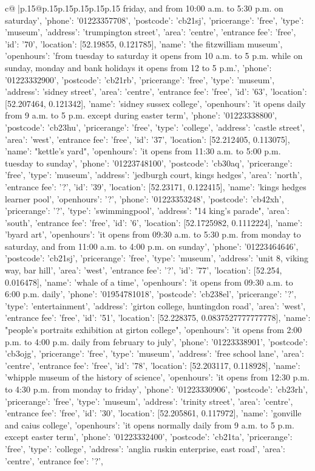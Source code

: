 \documentclass{article}
\begin{document}
{\begin{supertabular}{c@{$\;$}|p{.15\linewidth}@{}p{.15\linewidth}p{.15\linewidth}p{.15\linewidth}p{.15\linewidth}p{.15\linewidth}}
{{{friday, and from 10:00 a.m. to 5:30 p.m. on saturday', 'phone': '01223357708', 'postcode': 'cb21sj', 'pricerange': 'free', 'type': 'museum'}, {'address': 'trumpington street', 'area': 'centre', 'entrance fee': 'free', 'id': '70', 'location': [52.19855, 0.121785], 'name': 'the fitzwilliam museum', 'openhours': 'from tuesday to saturday it opens from 10 a.m. to 5 p.m. while on sunday, monday and bank holidays it opens from 12 to 5 p.m.', 'phone': '01223332900', 'postcode': 'cb21rb', 'pricerange': 'free', 'type': 'museum'}, {'address': 'sidney street', 'area': 'centre', 'entrance fee': 'free', 'id': '63', 'location': [52.207464, 0.121342], 'name': 'sidney sussex college', 'openhours': 'it opens daily from 9 a.m. to 5 p.m. except during easter term', 'phone': '01223338800', 'postcode': 'cb23hu', 'pricerange': 'free', 'type': 'college'}, {'address': 'castle street', 'area': 'west', 'entrance fee': 'free', 'id': '37', 'location': [52.212405, 0.113075], 'name': "kettle's yard", 'openhours': 'it opens from 11:30 a.m. to 5:00 p.m. tuesday to sunday', 'phone': '01223748100', 'postcode': 'cb30aq', 'pricerange': 'free', 'type': 'museum'}, {'address': 'jedburgh court, kings hedges', 'area': 'north', 'entrance fee': '?', 'id': '39', 'location': [52.23171, 0.122415], 'name': 'kings hedges learner pool', 'openhours': '?', 'phone': '01223353248', 'postcode': 'cb42xh', 'pricerange': '?', 'type': 'swimmingpool'}, {'address': "14 king's parade", 'area': 'south', 'entrance fee': 'free', 'id': '6', 'location': [52.1725982, 0.1112224], 'name': 'byard art', 'openhours': 'it opens from 09:30 a.m. to 5:30 p.m. from monday to saturday, and from 11:00 a.m. to 4:00 p.m. on sunday', 'phone': '01223464646', 'postcode': 'cb21sj', 'pricerange': 'free', 'type': 'museum'}, {'address': 'unit 8, viking way, bar hill', 'area': 'west', 'entrance fee': '?', 'id': '77', 'location': [52.254, 0.016478], 'name': 'whale of a time', 'openhours': 'it opens from 09:30 a.m. to 6:00 p.m. daily', 'phone': '01954781018', 'postcode': 'cb238el', 'pricerange': '?', 'type': 'entertainment'}, {'address': 'girton college, huntingdon road', 'area': 'west', 'entrance fee': 'free', 'id': '51', 'location': [52.228375, 0.0837527777777778], 'name': "people's portraits exhibition at girton college", 'openhours': 'it opens from 2:00 p.m. to 4:00 p.m. daily from february to july', 'phone': '01223338901', 'postcode': 'cb3ojg', 'pricerange': 'free', 'type': 'museum'}, {'address': 'free school lane', 'area': 'centre', 'entrance fee': 'free', 'id': '78', 'location': [52.203117, 0.118928], 'name': 'whipple museum of the history of science', 'openhours': 'it opens from 12:30 p.m. to 4:30 p.m. from monday to friday', 'phone': '01223330906', 'postcode': 'cb23rh', 'pricerange': 'free', 'type': 'museum'}, {'address': 'trinity street', 'area': 'centre', 'entrance fee': 'free', 'id': '30', 'location': [52.205861, 0.117972], 'name': 'gonville and caius college', 'openhours': 'it opens normally daily from 9 a.m. to 5 p.m. except easter term', 'phone': '01223332400', 'postcode': 'cb21ta', 'pricerange': 'free', 'type': 'college'}, {'address': 'anglia ruskin enterprise, east road', 'area': 'centre', 'entrance fee': '?', }}}
\end{supertabular}}
\end{document}
